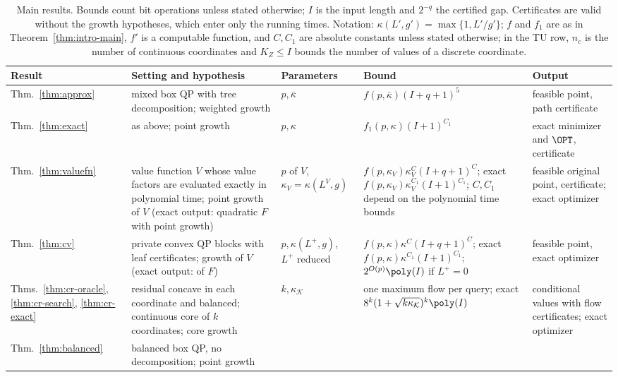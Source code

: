 \begin{table}[tbp]
\centering
\small
\setlength{\tabcolsep}{3pt}
\caption{Main results. Bounds count bit operations unless stated otherwise;
$I$ is the input length and $2^{-q}$ the certified gap. Certificates are
valid without the growth hypotheses, which enter only the running times.
Notation: $\kappa(L',g')=\max\{1,L'/g'\}$; $f$ and $f_1$ are as in
Theorem~\ref{thm:intro-main}, $f'$ is a computable function, and $C,C_1$ are
absolute constants unless stated otherwise; in the TU row, $n_c$ is the number of continuous coordinates and $K_Z\le I$
bounds the number of values of a discrete coordinate.}\label{tab:results}
\begin{tabular}{@{}>{\raggedright\arraybackslash}p{2.2cm}
>{\raggedright\arraybackslash}p{4.2cm}
>{\raggedright\arraybackslash}p{1.8cm}
>{\raggedright\arraybackslash}p{4.0cm}
>{\raggedright\arraybackslash}p{3.4cm}@{}}
\toprule
Result & Setting and hypothesis & Parameters & Bound & Output\\
\midrule
Thm.~\ref{thm:approx} & mixed box QP with tree decomposition; weighted
growth & $p,\bar\kappa$ & $f(p,\bar\kappa)(I+q+1)^5$ & feasible point, path
certificate\\
Thm.~\ref{thm:exact} & as above; point growth & $p,\kappa$ &
$f_1(p,\kappa)(I+1)^{C_1}$ & exact minimizer and $\OPT$, certificate\\
Thm.~\ref{thm:valuefn} & value function $V$ whose value factors are
evaluated exactly in polynomial time; point growth of $V$ (exact output:
quadratic $F$ with point growth) &
$p$ of $V$, $\kappa_V=\kappa(L^V,g)$ &
$f(p,\kappa_V)\kappa_V^{C}(I+q+1)^{C}$; exact
$f(p,\kappa_V)\kappa_V^{C_1}(I+1)^{C_1}$; $C,C_1$ depend on the
polynomial time bounds &
feasible original point, certificate; exact optimizer\\
Thm.~\ref{thm:cv} & private convex QP blocks with leaf certificates;
growth of $V$ (exact output: of $F$) & $p,\kappa(L^+,g)$, $L^+$ reduced &
$f(p,\kappa)\kappa^{C}(I+q+1)^{C}$; exact
$f(p,\kappa)\kappa^{C_1}(I+1)^{C_1}$; $2^{O(p)}\poly(I)$ if $L^+=0$ &
feasible point, exact optimizer\\
Thms.~\ref{thm:cr-oracle}, \ref{thm:cr-search}, \ref{thm:cr-exact} &
residual concave in each coordinate and balanced; continuous core of $k$
coordinates; core growth & $k,\kappa_{\mathcal K}$ & one maximum flow per
query; exact $8^k(1+\sqrt{k\kappa_{\mathcal K}})^k\poly(I)$ & conditional
values with flow certificates; exact optimizer\\
Thm.~\ref{thm:balanced} & balanced box QP, no decomposition; point growth &

\end{tabular}
\end{table}
